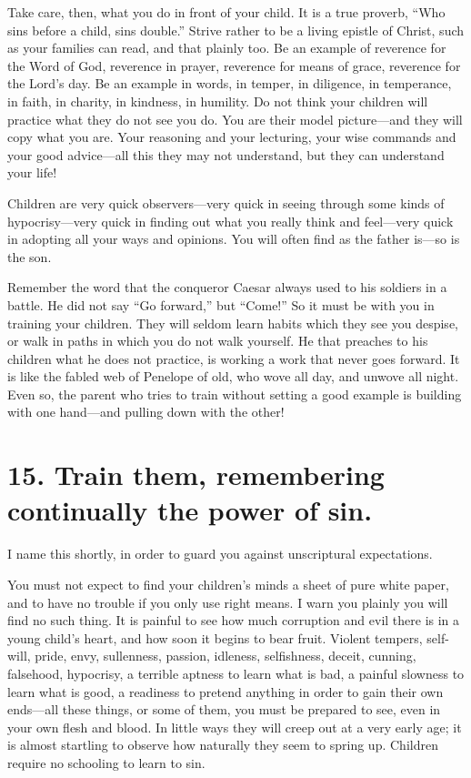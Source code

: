 \documentclass[
]{book}
\begin{document}
Take care, then, what you do in front of your child. It is a true proverb, ``Who sins before a child, sins double.'' Strive rather to be a living epistle of Christ, such as your families can read, and that plainly too. Be an example of reverence for the Word of God, reverence in prayer, reverence for means of grace, reverence for the Lord's day. Be an example in words, in temper, in diligence, in temperance, in faith, in charity, in kindness, in humility. Do not think your children will practice what they do not see you do. You are their model picture---and they will copy what you are. Your reasoning and your lecturing, your wise commands and your good advice---all this they may not understand, but they can understand your life!

Children are very quick observers---very quick in seeing through some kinds of hypocrisy---very quick in finding out what you really think and feel---very quick in adopting all your ways and opinions. You will often find as the father is---so is the son.

Remember the word that the conqueror Caesar always used to his soldiers in a battle. He did not say ``Go forward,'' but ``Come!'' So it must be with you in training your children. They will seldom learn habits which they see you despise, or walk in paths in which you do not walk yourself. He that preaches to his children what he does not practice, is working a work that never goes forward. It is like the fabled web of Penelope of old, who wove all day, and unwove all night. Even so, the parent who tries to train without setting a good example is building with one hand---and pulling down with the other!

\hypertarget{train-them-remembering-continually-the-power-of-sin.}{%
\section*{15. Train them, remembering continually the power of sin.}\label{train-them-remembering-continually-the-power-of-sin.}}

I name this shortly, in order to guard you against unscriptural expectations.

You must not expect to find your children's minds a sheet of pure white paper, and to have no trouble if you only use right means. I warn you plainly you will find no such thing. It is painful to see how much corruption and evil there is in a young child's heart, and how soon it begins to bear fruit. Violent tempers, self-will, pride, envy, sullenness, passion, idleness, selfishness, deceit, cunning, falsehood, hypocrisy, a terrible aptness to learn what is bad, a painful slowness to learn what is good, a readiness to pretend anything in order to gain their own ends---all these things, or some of them, you must be prepared to see, even in your own flesh and blood. In little ways they will creep out at a very early age; it is almost startling to observe how naturally they seem to spring up. Children require no schooling to learn to sin.
\end{document}
